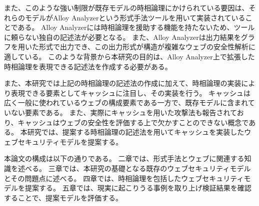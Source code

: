\documentclass[12pt,a4paper]{jbook}
\begin{document}
また、このような強い制限が既存モデルの時相論理にかけられている要因は、それらのモデルがAlloy Analyzerという形式手法ツールを用いて実装されていることである。
Alloy Analyzerには時相論理を援助する機能を持たないため、ツールに頼らない独自の記述法が必要となる。
また、Alloy Analyzerは出力結果をグラフを用いた形式で出力でき、この出力形式が構造が複雑なウェブの安全性解析に適している。
このような背景から本研究の目的は、Alloy Analyzer上で拡張した時相論理を表現できる記述法を作成する必要がある。

また、本研究では上記の時相論理の記述法の作成に加えて、時相論理の実装により表現できる要素としてキャッシュに注目し、その実装を行う。
キャッシュは広く一般に使われているウェブの構成要素である一方で、既存モデルに含まれていない要素である。
また、実際にキャッシュを用いた攻撃法\cite{bcpattack}も報告されており、キャッシュはウェブの安全性を評価する上で欠かすことのできない概念である。
本研究では、提案する時相論理の記述法を用いてキャッシュを実装したウェブセキュリティモデルを提案する。

本論文の構成は以下の通りである。
二章では、形式手法とウェブに関連する知識を述べる。
三章では、本研究の基礎となる既存のウェブセキュリティモデルとその問題点に述べる。
四章では、時相論理を包括したウェブセキュリティモデルを提案する。
五章では、現実に起こりうる事例を取り上げ検証結果を確認することで、提案モデルを評価する。
\end{document}

